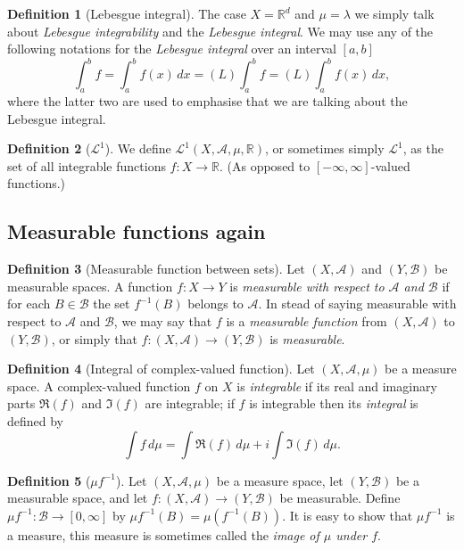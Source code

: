 \documentclass[12pt]{article}
\theoremstyle{definition}
\newtheorem{definition}{Definition}[section]
\newcommand{\real}{\mathbb{R}}   %
\newcommand{\algebra}{\mathscr{A}}
\renewcommand{\L}{\mathscr{L}}
\begin{document}
\begin{definition}[Lebesgue integral]
    The case $X=\real^d$ and $\mu=\lambda$ we simply talk about \textit{Lebesgue integrability} and the \textit{Lebesgue integral}. We may use any of the following notations for the \textit{Lebesgue integral} over an interval $[a,b]$
    \begin{equation*}
        \int_a^b f=\int_a^b f(x) \, dx=(L)\int_a^b f=(L)\int_a^b f(x) \, dx,
    \end{equation*}
    where the latter two are used to emphasise that we are talking about the Lebesgue integral.
\end{definition}
\begin{definition}[$\L^1$]
    We define $\L^1(X,\algebra,\mu,\real)$, or sometimes simply $\L^1$, as the set of all integrable functions $f:X\to \real$. (As opposed to $[-\infty,\infty]$-valued functions.)
\end{definition}
\subsection{Measurable functions again}
\begin{definition}[Measurable function between sets]
    Let $(X,\algebra)$ and $(Y,\mathscr{B})$ be measurable spaces. A function $f:X\to Y$ is \textit{measurable with respect to $\algebra$ and $\mathscr{B}$} if for each $B\in \mathscr{B}$ the set $f^{-1}(B)$ belongs to $\algebra$. In stead of saying measurable with respect to $\algebra$ and $\mathscr{B}$, we may say that $f$ is a \textit{measurable function} from $(X,\algebra)$ to $(Y,\mathscr{B})$, or simply that $f:(X,\algebra)\to (Y,\mathscr{B})$ is \textit{measurable}.
\end{definition}
\begin{definition}[Integral of complex-valued function]
    Let $(X,\algebra,\mu)$ be a measure space. A complex-valued function $f$ on $X$ is \textit{integrable} if its real and imaginary parts $\Re (f)$ and $\Im (f)$ are integrable; if $f$ is integrable then its \textit{integral} is defined by
    \begin{equation*}
        \int f \, d\mu = \int \Re(f) \, d\mu +i\int \Im(f) \, d\mu.
    \end{equation*}
\end{definition}
\begin{definition}[$\mu f^{-1}$]
    Let $(X,\algebra,\mu)$ be a measure space, let $(Y,\mathscr{B})$ be a measurable space, and let $f:(X,\algebra)\to(Y,\mathscr{B})$ be measurable. Define $\mu f^{-1}:\mathscr{B}\to [0,\infty]$ by $\mu f^{-1}(B)=\mu(f^{-1}(B))$. It is easy to show that $\mu f^{-1}$ is a measure, this measure is sometimes called the \textit{image of $\mu$ under $f$}.
\end{definition}
\newpage
\end{document}

